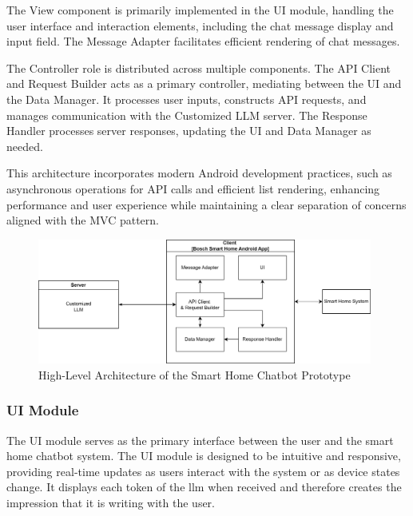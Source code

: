 The View component is primarily implemented in the UI module, handling the user interface and interaction elements, including the chat message display and input field. The Message Adapter facilitates efficient rendering of chat messages.

The Controller role is distributed across multiple components. The API Client and Request Builder acts as a primary controller, mediating between the UI and the Data Manager. It processes user inputs, constructs API requests, and manages communication with the Customized LLM server. The Response Handler processes server responses, updating the UI and Data Manager as needed.

This architecture incorporates modern Android development practices, such as asynchronous operations for API calls and efficient list rendering, enhancing performance and user experience while maintaining a clear separation of concerns aligned with the MVC pattern.


\begin{figure}[h]
\centering
\includegraphics[width=0.98\textwidth]{graphics/ConceptOverview.png}
\caption{High-Level Architecture of the Smart Home Chatbot Prototype}
\label{fig:architecture}
\end{figure}

\subsubsection{UI Module}
The UI module serves as the primary interface between the user and the smart home chatbot system.
The UI module is designed to be intuitive and responsive, providing real-time updates as users interact with the system or as device states change.
It displays each token of the \gls{llm} when received and therefore creates the impression that it is writing with the user.

